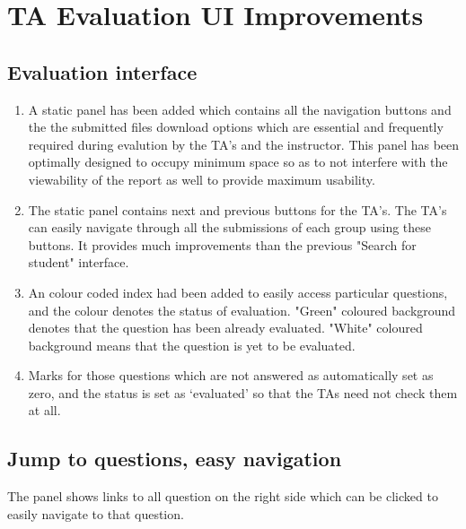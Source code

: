 \section{TA Evaluation UI Improvements}

\subsection{Evaluation interface}

\begin{enumerate}
\item A static panel has been added which contains all the navigation buttons and the the submitted files download options which are essential and frequently required during evalution by the TA's and the instructor. This panel has been optimally designed to occupy minimum space so as to not interfere with the viewability of the report as well to provide maximum usability.
\item The static panel contains next and previous buttons for the TA's. The TA's can easily navigate through all the submissions of each group using these buttons. It provides much improvements than the previous "Search for student" interface.
\item An colour coded index had been added to easily access particular questions, and the colour denotes the status of evaluation. "Green" coloured background denotes that the question has been already evaluated. "White" coloured background means that the question is yet to be evaluated.
\item Marks for those questions which are not answered as automatically set as zero, and the status is set as `evaluated' so that the TAs need not check them at all.
\end{enumerate}

\subsection{Jump to questions, easy navigation}
The panel shows links to all question on the right side which can be clicked to easily navigate to that question.
